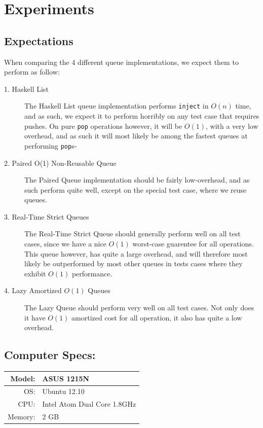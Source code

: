 
\section{Experiments}
\subsection{Expectations}
When comparing the 4 different queue implementations, we expect them to perform as follow:
\begin{description}

\item[1. Haskell List]
The Haskell List queue implementation performs \texttt{inject} in $O(n)$ time, and as such, we expect it to perform horribly on any test case that requires pushes.
On pure \texttt{pop} operations however, it will be $O(1)$, with a very low overhead, and as such it will most likely be among the fastest queues at performing \texttt{pop}s-
\item[2. Paired O(1) Non-Reusable Queue]
The Paired Queue implementation should be fairly low-overhead, and as such perform quite well, except on the special test case, where we reuse queues.
\item[3. Real-Time Strict Queues] 
The Real-Time Strict Queue should generally perform well on all test cases, since we have a nice $O(1)$ worst-case guarentee for all operations. This queue however, has quite a large overhead, and will therefore most likely be outperformed by most other queues in tests cases where they exhibit $O(1)$ performance. 
\item[4. Lazy Amortized $O(1)$ Queues]
The Lazy Queue should perform very well on all test cases. Not only does it have $O(1)$ amortized cost for all operation, it also has quite a low overhead. 

\end{description}

\subsection{Computer Specs:}
\begin{tabular}{| r  l |} \hline
Model: &  ASUS 1215N \\ \hline
OS: & Ubuntu 12.10 \\ \hline
CPU: & Intel Atom Dual Core 1.8GHz\\ \hline
Memory: & 2 GB\\ \hline
\end{tabular}

